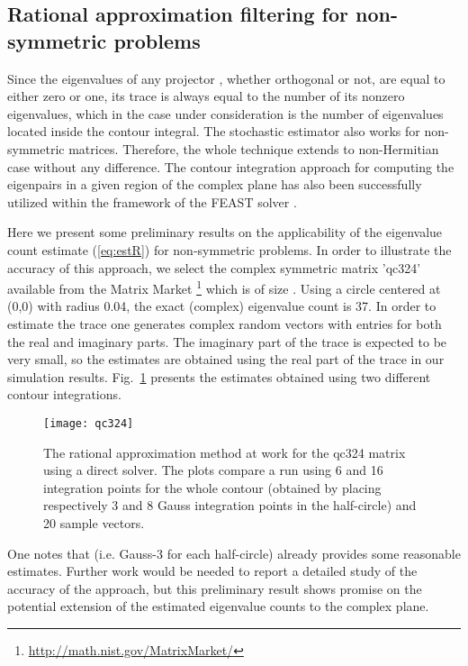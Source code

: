 \documentclass[12pt]{article}		\usepackage{tabls,multirow}
\begin{document}
\subsection{Rational approximation filtering for non-symmetric problems}
 
Since the eigenvalues of any projector , whether orthogonal or not,
are equal to either zero or one, its trace is always equal to the
number of its nonzero eigenvalues, which in the case under
consideration is the number of eigenvalues located inside the contour
integral. The stochastic estimator also works for non-symmetric
matrices. Therefore, the whole technique extends to non-Hermitian case
without any difference. The contour integration approach for computing
the eigenpairs in a given region of the complex plane has also been
successfully utilized within the framework of the FEAST solver
\cite{laux}.


Here we present some preliminary results on the applicability of the
eigenvalue count estimate (\ref{eq:estR}) for non-symmetric problems.
In order to illustrate the accuracy of this approach, we select the complex symmetric matrix 'qc324' available
from the Matrix Market
\footnote{\url{http://math.nist.gov/MatrixMarket/}} which is of size
. Using a circle centered at (0,0) with radius 0.04, the
exact (complex) eigenvalue count is 37. In order to estimate the trace
 one generates complex random vectors 
with entries  for both the real and imaginary parts. The
imaginary part of the trace is expected to be very small, so the
estimates are obtained using the real part of the trace in our
simulation results.  Fig.~\ref{fig:qc324} presents the estimates
obtained using two different contour integrations.
\begin{figure}[hbt]
\centerline{ 
\texttt{[image: qc324]}} 
\caption{The rational approximation method at work for the qc324 
matrix using a direct solver.
The plots compare a run using 6 and 16 integration points for the 
whole contour (obtained by placing 
respectively 3 and 8 Gauss integration points in the half-circle) and 20
sample vectors. 
\label{fig:qc324}}
\end{figure}
One notes that  (i.e. Gauss-3 for each half-circle) already 
provides some reasonable estimates.
Further work would be needed to report a detailed study of the accuracy of the approach, but 
this preliminary result shows promise on the potential extension of
the estimated eigenvalue counts to the complex plane.
\end{document}
